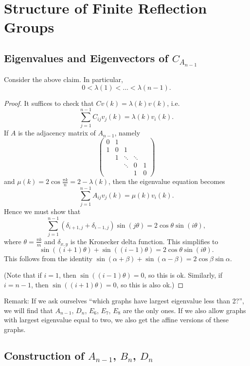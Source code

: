 \section{Structure of Finite Reflection Groups}

\subsection{Eigenvalues and Eigenvectors of $C_{A_{n-1}}$}

Consider the above claim. In particular,
\[
    0 < \lambda(1) < \dots < \lambda(n-1).
\]
\begin{proof}
It suffices to check that $C v(k) = \lambda(k) v(k)$, i.e.
\[
    \sum_{j=1}^{n-1} C_{ij} v_j(k) = \lambda(k) v_i(k).
\]
If $A$ is the adjacency matrix of $A_{n-1}$, namely
\[
    \begin{pmatrix}
        0 & 1 \\
        1 & 0 & 1 \\
          & 1 & \ddots & \ddots \\
          &   & \ddots & 0 & 1 \\
          &   &        & 1 & 0
    \end{pmatrix}
\]
and $\mu(k) = 2 \cos \frac{\pi k}{n} = 2 - \lambda(k)$, then the eigenvalue
equation becomes
\[
    \sum_{j=1}^{n-1} A_{ij} v_j(k) = \mu(k) v_i(k).
\]
Hence we must show that
\[
    \sum_{j=1}^{n-1} (\delta_{i+1,j} + \delta_{i-1,j}) \sin (j \theta)
    = 2 \cos \theta \sin (i \theta),
\]
where $\theta = \frac{\pi k}{m}$ and $\delta_{x,y}$ is the Kronecker delta function.
This simplifies to
\[
    \sin((i+1) \theta) + \sin ((i-1)\theta) = 2 \cos \theta \sin (i \theta).
\]
This follows from the identity $\sin (\alpha + \beta) + \sin (\alpha - \beta)
= 2 \cos \beta \sin \alpha$.

(Note that if $i=1$, then $\sin ((i-1) \theta) = 0$, so this is ok. Similarly,
if $i=n-1$, then $\sin((i+1) \theta) = 0$, so this is also ok.)
\end{proof}

Remark: If we ask ourselves ``which graphs have largest eigenvalue less than
2?'', we will find that $A_{n-1}$, $D_n$, $E_6$, $E_7$, $E_8$ are the only ones.
If we also allow graphs with largest eigenvalue equal to two, we also get the
affine versions of these graphs.
\\

\subsection{Construction of $A_{n-1}$, $B_n$, $D_n$}

